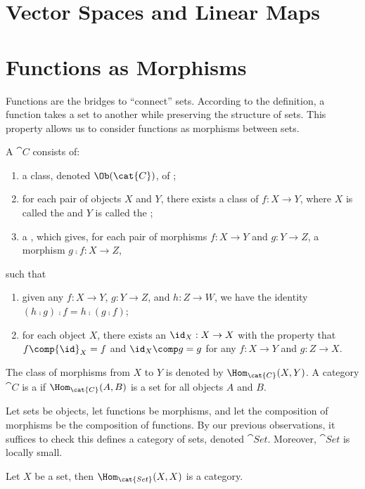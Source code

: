 \documentclass[10pt]{article}
\begin{document}
\section{Vector Spaces and Linear Maps}

\newpage

\section{Functions as Morphisms}
Functions are the bridges to ``connect'' sets. According to the definition, a function takes a set to another while preserving the structure of sets. This property allows us to consider functions as morphisms between sets.
\begin{definition}
    A  $\cat{C}$ consists of:
    \begin{enumerate}
        \item a class, denoted $\Ob(\cat{C})$, of ;
        \item for each pair of objects $X$ and $Y$, there exists a class of  $f:X\to Y$, where $X$ is called the  and $Y$ is called the ;
        \item a , which gives, for each pair of morphisms $f:X\to Y$ and $g:Y\to Z$, a morphism $g\comp f:X\to Z$,
    \end{enumerate}
    such that
    \begin{enumerate}
        \item given any $f:X\to Y$, $g:Y\to Z$, and $h:Z\to W$, we have the identity $(h\comp g)\comp f=h\comp(g\comp f)$;
        \item for each object $X$, there exists an  ${\id}_{X}:X\to X$ with the property that $f\comp{\id}_{X}=f$ and ${\id}_{X}\comp g=g$ for any $f:X\to Y$ and $g:Z\to X$.
    \end{enumerate}
    The class of morphisms from $X$ to $Y$ is denoted by ${\Hom}_{\cat{C}}(X,Y)$. A category $\cat{C}$ is a  if ${\Hom}_{\cat{C}}(A,B)$ is a set for all objects $A$ and $B$.
\end{definition}
\par
Let sets be objects, let functions be morphisms, and let the composition of morphisms be the composition of functions. By our previous observations, it suffices to check this defines a category of sets, denoted $\cat{Set}$. Moreover, $\cat{Set}$ is locally small.
\begin{example}
    Let $X$ be a set, then ${\Hom}_{\cat{Set}}(X,X)$ is a category.
\end{example}
\end{document}
